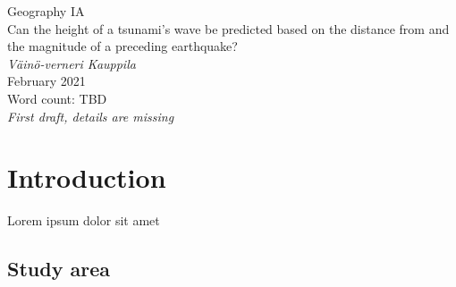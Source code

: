 \documentclass[11pt,letterpaper]{article}
\begin{document}



\begin{titlepage}
    \begin{center}
        \vspace*{4cm}
        Geography IA \\
        \vspace{1cm}
        Can the height of a tsunami's wave be predicted based on the distance from and
        the magnitude of a preceding earthquake? \\
        \vspace{1cm}
        \textit{Väinö-verneri Kauppila} \\
        February 2021 \\
        \vspace{4cm}
        Word count: TBD \\
        \textit{First draft, details are missing}
        \vfill
        \vspace{0.1cm}
    \end{center}
\end{titlepage}



\begin{center}
    \tableofcontents
    \vspace{1in}

\end{center}



\newpage


\section{Introduction}

Lorem ipsum dolor sit amet

\subsection{Study area}
\end{document}
